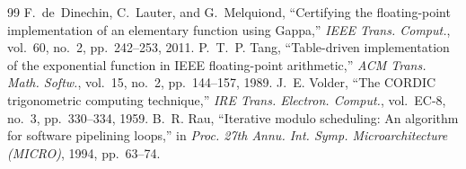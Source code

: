 \documentclass[conference]{IEEEtran}
\begin{document}
\begin{thebibliography}{99}
 F.~de~Dinechin, C.~Lauter, and G.~Melquiond, ``Certifying the floating-point implementation of an elementary function using Gappa,'' \emph{IEEE Trans. Comput.}, vol.~60, no.~2, pp.~242--253, 2011.
 P.~T.~P. Tang, ``Table-driven implementation of the exponential function in IEEE floating-point arithmetic,'' \emph{ACM Trans. Math. Softw.}, vol.~15, no.~2, pp.~144--157, 1989.
 J.~E. Volder, ``The CORDIC trigonometric computing technique,'' \emph{IRE Trans. Electron. Comput.}, vol.~EC-8, no.~3, pp.~330--334, 1959.
 B.~R. Rau, ``Iterative modulo scheduling: An algorithm for software pipelining loops,'' in \emph{Proc. 27th Annu. Int. Symp. Microarchitecture (MICRO)}, 1994, pp.~63--74.
\end{thebibliography}
\end{document}
